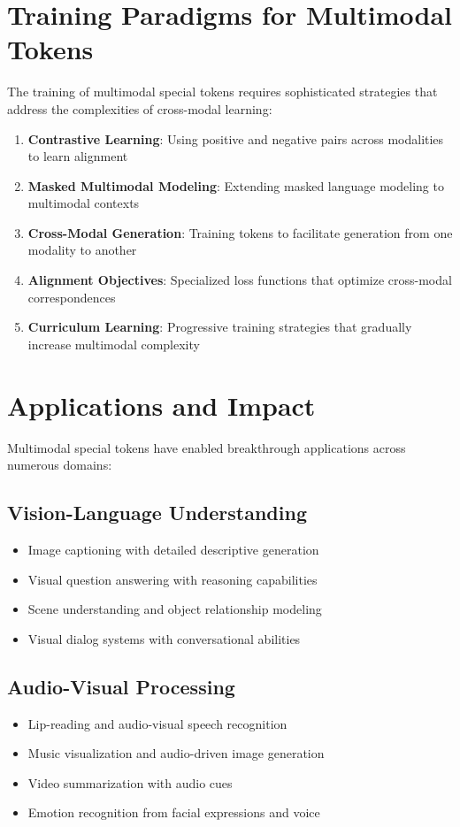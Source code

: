 \section{Training Paradigms for Multimodal Tokens}

The training of multimodal special tokens requires sophisticated strategies that address the complexities of cross-modal learning:

\begin{enumerate}
\item \textbf{Contrastive Learning}: Using positive and negative pairs across modalities to learn alignment
\item \textbf{Masked Multimodal Modeling}: Extending masked language modeling to multimodal contexts
\item \textbf{Cross-Modal Generation}: Training tokens to facilitate generation from one modality to another
\item \textbf{Alignment Objectives}: Specialized loss functions that optimize cross-modal correspondences
\item \textbf{Curriculum Learning}: Progressive training strategies that gradually increase multimodal complexity
\end{enumerate}

\section{Applications and Impact}

Multimodal special tokens have enabled breakthrough applications across numerous domains:

\subsection{Vision-Language Understanding}
\begin{itemize}
\item Image captioning with detailed descriptive generation
\item Visual question answering with reasoning capabilities
\item Scene understanding and object relationship modeling
\item Visual dialog systems with conversational abilities
\end{itemize}

\subsection{Audio-Visual Processing}
\begin{itemize}
\item Lip-reading and audio-visual speech recognition
\item Music visualization and audio-driven image generation
\item Video summarization with audio cues
\item Emotion recognition from facial expressions and voice
\end{itemize}

